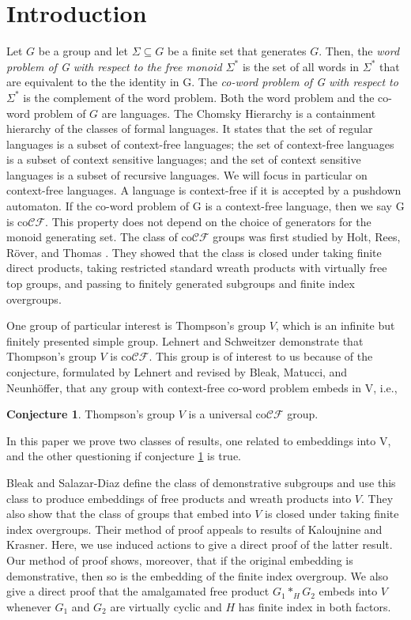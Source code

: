 \documentclass[11pt]{amsart}
\theoremstyle{plain}
\theoremstyle{remark}
\theoremstyle{definition}
\newtheorem{conjecture}[theorem]{Conjecture}
\theoremstyle{remark}
\theoremstyle{named}
\begin{document}
\section{Introduction}
Let $G$ be a group and let $\Sigma \subseteq G$ be a finite set that generates $G$. Then, the \emph{word problem of G with respect to the free monoid $\Sigma^*$} is the set of all words in $\Sigma^*$ that are equivalent to the the identity in G. The \emph{co-word problem of G with respect to $\Sigma^*$} is the complement of the word problem. Both the word problem and the co-word problem of $G$ are languages. The Chomsky Hierarchy is a containment hierarchy of the classes of formal languages. It states that the set of regular languages is a subset of context-free languages; the set of context-free languages is a subset of context sensitive languages; and the set of context sensitive languages is a subset of recursive languages. We will focus in particular on context-free languages. A language is context-free if it is accepted by a pushdown automaton. If the co-word problem of G is a context-free language, then we say G is co$\mathcal{CF}$. This property does not depend on the choice of generators for the monoid generating set. The class of co$\mathcal{CF}$ groups was first studied by Holt, Rees, R\"{o}ver, and Thomas \cite{Holt}. They showed that the class is closed under taking finite direct products, taking restricted standard wreath products with virtually free top groups, and passing to finitely generated subgroups and finite index overgroups. 

One group of particular interest is Thompson's group $V$, which is an infinite but finitely presented simple group. Lehnert and Schweitzer demonstrate that Thompson's group $V$ is co$\mathcal{CF}$. This group is of interest to us because of the conjecture, formulated by Lehnert and revised by Bleak, Matucci, and Neunh\"{o}ffer, that any group with context-free co-word problem embeds in V, i.e., 
\begin{conjecture}\label{bigone}
Thompson's group $V$ is a universal co$\mathcal{CF}$ group.
\end{conjecture}

In this paper we prove two classes of results, one related to embeddings into V, and the other questioning if conjecture \ref{bigone} is true. 

Bleak and Salazar-Diaz define the class of demonstrative subgroups and use this class to produce embeddings of free products and wreath products into $V$. They also show that the class of groups that embed into $V$ is closed under taking finite index overgroups. Their method of proof appeals to results of Kaloujnine and Krasner. Here, we use induced actions to give a direct proof of the latter result. Our method of proof shows, moreover, that if the original embedding is demonstrative, then so is the embedding of the finite index overgroup. We also give a direct proof that the amalgamated free product $G_1 \ast_H G_2$ embeds into $V$ whenever $G_1$ and $G_2$ are virtually cyclic and $H$ has finite index in both factors. 
\end{document}
